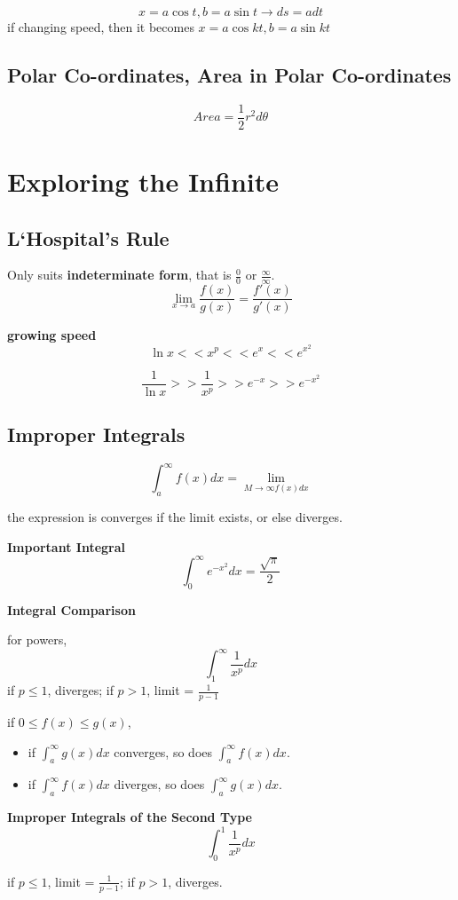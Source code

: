 \documentclass{article}
\newcommand\limitx[1]{\lim_{x \to #1}}
\newcommand\improperint[1]{\int_{#1}^\infty}
\begin{document}
$$ x = a\cos t, b = a\sin t \rightarrow ds = adt$$
if changing speed, then it becomes $x = a\cos kt, b = a\sin kt$

\subsection{Polar Co-ordinates, Area in Polar Co-ordinates}

$$Area = \frac{1}{2}r^2d\theta$$

\section{Exploring the Infinite}
\subsection{L‘Hospital's Rule}
Only suits \textbf{indeterminate form}, that is $\frac{0}{0}$ or $\frac{\infty}{\infty}$.
$$\limitx{a} \frac{f(x)}{g(x)} = \frac{f'(x)}{g'(x)}$$

\textbf{growing speed}
$$\ln x << x^p << e^x << e^{x^2}$$

$$\frac{1}{\ln x} >> \frac{1}{x^p} >> e^{-x} >> e^{-x^2}$$

\subsection{Improper Integrals}
$$\int_a^\infty f(x)dx = \lim_{M \rightarrow \infty f(x)dx}$$

the expression is converges if the limit exists, or else diverges.

\textbf{Important Integral}
$$\improperint{0}e^{-x^2}dx = \frac{\sqrt{\pi}}{2}$$

\textbf{Integral Comparison}

for powers,
$$\improperint{1}\frac{1}{x^p}dx$$
if $p \leq 1$, diverges; if $p > 1$, limit = $\frac{1}{p-1}$

if $0 \leq f(x) \leq g(x)$,
\begin{itemize}
  \item if $\improperint{a}g(x)dx$ converges, so does $\improperint{a}f(x)dx$.
  \item if $\improperint{a}f(x)dx$ diverges, so does $\improperint{a}g(x)dx$.
\end{itemize}

\textbf{Improper Integrals of the Second Type}
$$\int_0^1\frac{1}{x^p}dx$$

if $p \leq 1$, limit = $\frac{1}{p-1}$; if $p > 1$, diverges.
\end{document}
